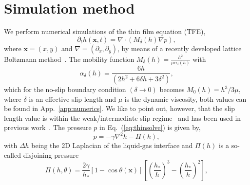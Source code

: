 \documentclass[twoside,twocolumn,9pt]{article}
\begin{document}
\section{Simulation method}
\label{sec:method}
We perform numerical simulations of the thin film equation (TFE),  
\begin{equation}\label{eq:thinsolve}
     \partial_t h(\mathbf{x},t) = \nabla\cdot\left(M_{\delta}(h)\nabla p\right),
\end{equation}
where $\mathbf{x} = (x,y)$ and $\nabla = (\partial_x, \partial_y)$, by means of a recently 
developed lattice Boltzmann method~\cite{zitzLatticeBoltzmannMethod2019, zitzLatticeBoltzmannSimulations2021, zitzSwalbeJlLattice2022, zitzControllingDewettingMorphologies2023}. 
The mobility function $M_{\delta}(h) = \frac{h^2}{\mu\alpha_{\delta}(h)}$ with 
\begin{equation}\label{eq:alphafric}
    \alpha_{\delta}(h) = \frac{6h}{(2 h^2 + 6 \delta h + 3 \delta^2)},
\end{equation}
which for the no-slip boundary condition $(\delta \rightarrow 0)$ becomes $M_{0}(h) = h^3/3\mu$, where $\delta$ is an effective slip length and $\mu$ is the dynamic viscosity, both values can be found in App.~\ref{app:numerics}.
We like to point out, however, that the slip length value is within the weak/intermediate slip regime~\cite{peschkaSignaturesSlipDewetting2019,fetzerQuantifyingHydrodynamicSlip2007, munchLubricationModelsSmall2005} and has been used in previous work~\cite{zitzControllingDewettingMorphologies2023}.
The pressure $p$ in Eq.~(\ref{eq:thinsolve}) is given by,
\begin{equation}\label{eq:filmpressure}
    p = - \gamma\nabla^2 h -\Pi(h),
\end{equation}
with $\Delta h$ being the 2D Laplacian of the liquid-gas interface and $\Pi(h)$ is a so-called disjoining pressure~\cite{schwartzSimulationDropletMotion1998, crasterDynamicsStabilityThin2009, nguyenCompetitionCollapseBreakup2012, gonzalezStabilityLiquidRing2013}
\begin{equation}\label{eq:disjoinpressure}
    \Pi(h,\theta) = \frac{2\gamma}{h_{\ast}}[1-\cos\theta(\mathbf{x})]\left[\left(\frac{h_*}{h}\right)^3 -\left(\frac{h_*}{h}\right)^2\right],
\end{equation}
\end{document}
